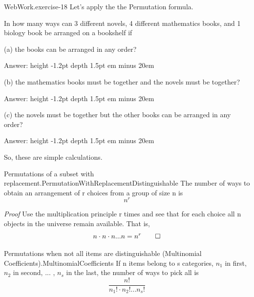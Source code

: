 \documentclass[10pt,]{book}
\makeatletter
\newcommand{\fillin}[1]{\leavevmode\leaders\vrule height -1.2pt depth 1.5pt \hskip #1em minus #1em \null}
\renewcommand*{\proofname}{Proof}
\renewenvironment{proof}[1][\proofname]{\par
  \pushQED{\qed}%
  \normalfont \topsep6\p@\@plus6\p@\relax
  \trivlist
  \item\relax
    {\itshape
    #1\@addpunct{.}}\hspace\labelsep\ignorespaces
}{%
  \popQED\endtrivlist\@endpefalse
}
\numberwithin{equation}{section}
\makeatother
\begin{document}
\par
\hypertarget{p-368}{}%
\begin{inlineexercise}{WebWork.}{exercise-18}%
\hypertarget{p-369}{}%
Let's apply the the Permutation formula.%
\par\medskip
\hypertarget{p-370}{}%
In how many ways can 3 different novels, 4 different mathematics books, and 1 biology book be arranged on a bookshelf if%
\par
\hypertarget{p-371}{}%
(a) the books can be arranged in any order?%
\par
\hypertarget{p-372}{}%
Answer:  \fillin{20}%
\par
\hypertarget{p-373}{}%
(b) the mathematics books must be together and the novels must be together?%
\par
\hypertarget{p-374}{}%
Answer:  \fillin{20}%
\par
\hypertarget{p-375}{}%
(c) the novels must be together but the other books can be arranged in any order?%
\par
\hypertarget{p-376}{}%
Answer:  \fillin{20}%
\par\medskip\noindent \hypertarget{p-377}{}%
So, these are simple calculations.%
\par
\end{inlineexercise}
%
\par
\hypertarget{p-378}{}%
\begin{theorem}{Permutations of a subset with replacement.}{}{PermutationWithReplacementDistinguishable}%
\hypertarget{p-379}{}%
The number of ways to obtain an arrangement of r choices from a group of size n is%
\begin{equation*}
n^r
\end{equation*}
%
\end{theorem}
\begin{proof}\hypertarget{proof-8}{}
\hypertarget{p-380}{}%
Use the multiplication principle r times and see that for each choice all n objects in the universe remain available.  That is,%
\begin{equation*}
n \cdot n \cdot n ... n = n^r\qedhere
\end{equation*}
%
\end{proof}
%
\par
\hypertarget{p-381}{}%
\begin{theorem}{Permutations when not all items are distinguishable (Multinomial Coefficients).}{}{MultinomialCoefficients}%
\hypertarget{p-382}{}%
If n items belong to s categories, \(n_1\) in first, \(n_2\) in second, ... , \(n_s\) in the last, the number of ways to pick all is%
\begin{equation*}
\frac{n!}{n_1! \cdot n_2! ... n_s!}
\end{equation*}
%
\end{theorem}
\end{document}
